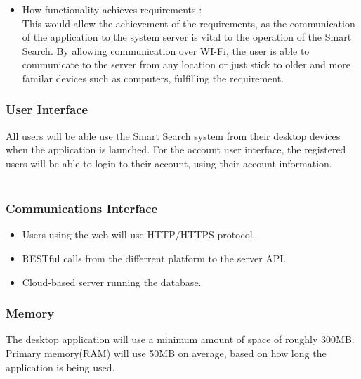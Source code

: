 \documentclass[a4paper,10pt]{article}
\begin{document}
{\begin{enumerate}
\begin{itemize}
						The functionality of the software interface is to facilitate the communication between the hardware infrastructure of the device(s) running the application's front-end and the Reroute Server. An example of this would be the operating system of the device in use. The operating system would allow the application to make use of the networking infrastructure and communicate the necessary information to the application via RESTful calls. This would enable the device to communicate with the server and perform the necessary requests.
\\
					\item How functionality achieves requirements :\\
This would allow the achievement of the requirements, as the communication of the application to the system server is vital to the operation of the Smart Search. By allowing communication over WI-Fi, the user is able to communicate to the server from any location  or just stick to older and more familar devices such as computers, fulfilling the requirement.
					\end{itemize}
			\end{enumerate} 
}

		
            \subsubsection{User Interface}
	    All users will be able use the Smart Search system from their desktop devices when the application is launched.
For the account user interface, the registered users will be able to login to their account, using their account information.
\\\\
	    \subsubsection{Communications Interface}
	 \begin{itemize}
	    \item Users using the web will use HTTP/HTTPS protocol.
	    \item RESTful calls from the differrent platform to the server API.
	    \item Cloud-based server running the database.
	    \end{itemize}
            \subsubsection{Memory}
	    {The desktop application will use a minimum amount of space of roughly 300MB.\\
		Primary memory(RAM) will use 50MB on average, based on how long the application is being used.}
		
\end{document}
